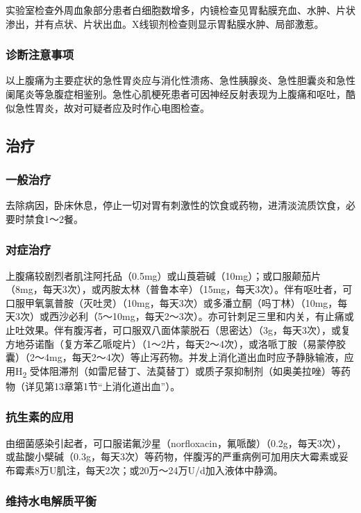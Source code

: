 实验室检查外周血象部分患者白细胞数增多，内镜检查见胃黏膜充血、水肿、片状渗出，并有点状、片状出血。X线钡剂检查则显示胃黏膜水肿、局部激惹。

\subsubsection{诊断注意事项}

以上腹痛为主要症状的急性胃炎应与消化性溃疡、急性胰腺炎、急性胆囊炎和急性阑尾炎等急腹症相鉴别。急性心肌梗死患者可因神经反射表现为上腹痛和呕吐，酷似急性胃炎，故对可疑者应及时作心电图检查。

\subsection{治疗}

\subsubsection{一般治疗}

去除病因，卧床休息，停止一切对胃有刺激性的饮食或药物，进清淡流质饮食，必要时禁食1～2餐。

\subsubsection{对症治疗}

上腹痛较剧烈者肌注阿托品（0.5mg）或山莨菪碱（10mg）；或口服颠茄片（8mg，每天3次），或丙胺太林（普鲁本辛）（15mg，每天3次）。伴有呕吐者，可口服甲氧氯普胺（灭吐灵）（10mg，每天3次）或多潘立酮（吗丁林）（10mg，每天3次）或西沙必利（5～10mg，每天2～3次）。亦可针刺足三里和内关，有止痛或止吐效果。伴有腹泻者，可口服双八面体蒙脱石（思密达）（3g，每天3次），或复方地芬诺酯（复方苯乙哌啶片）（1～2片，每天2～4次），或洛哌丁胺（易蒙停胶囊）（2～4mg，每天2～4次）等止泻药物。并发上消化道出血时应予静脉输液，应用H\textsubscript{2}
受体阻滞剂（如雷尼替丁、法莫替丁）或质子泵抑制剂（如奥美拉唑）等药物（详见第13章第1节“上消化道出血”）。

\subsubsection{抗生素的应用}

由细菌感染引起者，可口服诺氟沙星（norfloxacin，氟哌酸）（0.2g，每天3次），或盐酸小檗碱（0.3g，每天3次）等药物，伴腹泻的严重病例可加用庆大霉素或妥布霉素8万U肌注，每天2次；或20万～24万U/d加入液体中静滴。

\subsubsection{维持水电解质平衡}

